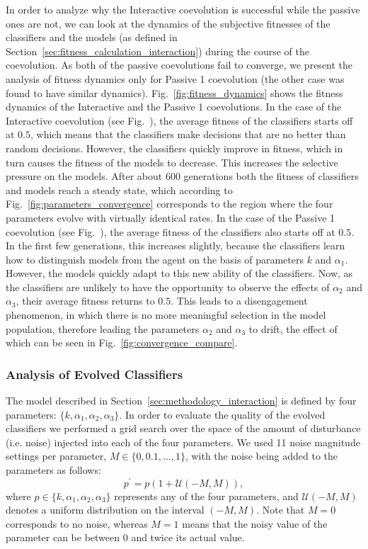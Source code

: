 In order to analyze why the Interactive coevolution is successful while the passive ones are not, we can look at the dynamics of the subjective fitnesses of the classifiers and the models (as defined in Section~\ref{sec:fitness_calculation_interaction}) during the course of the coevolution. As both of the passive coevolutions fail to converge, we present the analysis of fitness dynamics only for Passive 1 coevolution (the other case was found to have similar dynamics). Fig.~\ref{fig:fitness_dynamics} shows the fitness dynamics of the Interactive and the Passive 1 coevolutions. In the case of the Interactive coevolution (see Fig.~), the average fitness of the classifiers starts off at $0.5$, which means that the classifiers make decisions that are no better than random decisions. However, the classifiers quickly improve in fitness, which in turn causes the fitness of the models to decrease. This increases the selective pressure on the models. After about $600$ generations both the fitness of classifiers and models reach a steady state, which according to Fig.~\ref{fig:parameters_convergence} corresponds to the region where the four parameters evolve with virtually identical rates. In the case of the Passive 1 coevolution (see Fig.~), the average fitness of the classifiers also starts off at $0.5$. In the first few generations, this increases slightly, because the classifiers learn how to distinguish models from the agent on the basis of parameters $k$ and $\alpha_1$. However, the models quickly adapt to this new ability of the classifiers. Now, as the classifiers are unlikely to have the opportunity to observe the effects of $\alpha_2$ and $\alpha_3$, their average fitness returns to $0.5$. This leads to a disengagement phenomenon, in which there is no more meaningful selection in the model population, therefore leading the parameters $\alpha_2$ and $\alpha_3$ to drift, the effect of which can be seen in Fig.~\ref{fig:convergence_compare}.

\subsubsection{Analysis of Evolved Classifiers}\label{sec: analysis_of_the_evolved_classifiers}

The model described in Section~\ref{sec:methodology_interaction} is defined by four parameters: $\{ k, \alpha_1, \alpha_2,\alpha_3 \}$. In order to evaluate the quality of the evolved classifiers we performed a grid search over the space of the amount of disturbance (i.e. noise) injected into each of the four parameters. We used 11 noise magnitude settings per parameter, $M\in\{0, 0.1, \dots, 1\}$, with the noise being added to the parameters as follows:
\begin{equation}\label{eq:noise_on_magnitudes}
p^{\prime} = p(1 + \mathcal{U}(-M, M)),
\end{equation}
where $p\in\{ k, \alpha_1, \alpha_2,\alpha_3 \}$ represents any of the four parameters, and $\mathcal{U}(-M,M)$ denotes a uniform distribution on the interval $(-M,M)$. Note that $M=0$ corresponds to no noise, whereas $M=1$ means that the noisy value of the parameter can be between $0$ and twice its actual value.

